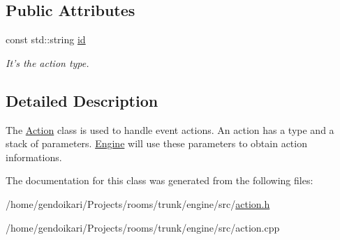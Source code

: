 \subsection*{Public Attributes}
\begin{DoxyCompactItemize}
\item 
\hypertarget{classAction_af88a21fc6ca41418d1ba07c7a9ee190a}{
const std::string \hyperlink{classAction_af88a21fc6ca41418d1ba07c7a9ee190a}{id}}
\label{classAction_af88a21fc6ca41418d1ba07c7a9ee190a}

\begin{DoxyCompactList}\small\item\em It's the action type. \item\end{DoxyCompactList}\end{DoxyCompactItemize}


\subsection{Detailed Description}
The \hyperlink{classAction}{Action} class is used to handle event actions. An action has a type and a stack of parameters. \hyperlink{classEngine}{Engine} will use these parameters to obtain action informations. 

The documentation for this class was generated from the following files:\begin{DoxyCompactItemize}
\item 
/home/gendoikari/Projects/rooms/trunk/engine/src/\hyperlink{action_8h}{action.h}\item 
/home/gendoikari/Projects/rooms/trunk/engine/src/action.cpp\end{DoxyCompactItemize}
